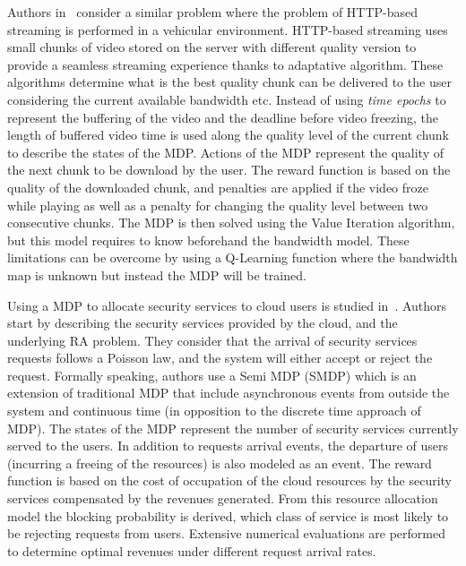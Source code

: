 Authors in~\cite{Bokani2015} consider a similar problem where the problem of HTTP-based streaming is performed in a vehicular environment.
HTTP-based streaming uses small chunks of video stored on the server with different quality version to provide a seamless streaming experience thanks to adaptative algorithm. 
These algorithms determine what is the best quality chunk can be delivered to the user considering the current available bandwidth etc. Instead of using \textit{time epochs} to represent the buffering of the video and the deadline before video freezing, the length of buffered video time is used along the quality level of the current chunk to describe the states of the MDP. 
Actions of the MDP represent the quality of the next chunk to be download by the user.
The reward function is based on the quality of the downloaded chunk, and penalties are applied if the video froze while playing as well as a penalty for changing the quality level between two consecutive chunks.
The MDP is then solved using the Value Iteration algorithm, but this model requires to know beforehand the bandwidth model. 
These limitations can be overcome by using a Q-Learning function where the bandwidth map is unknown but instead the MDP will be trained.


Using a MDP to allocate security services to cloud users is studied in~\cite{Liang2011}.
Authors start by describing the security services provided by the cloud, and the underlying RA problem.
They consider that the arrival of security services requests follows a Poisson law, and the system will either accept or reject the request. Formally speaking, authors use a Semi MDP (SMDP) which is an extension of traditional MDP that include asynchronous events from outside the system and continuous time (in opposition to the discrete time approach of MDP).
The states of the MDP represent the number of security services currently served to the users. In addition to requests arrival events, the departure of users (incurring a freeing of the resources) is also modeled as an event. The reward function is based on the cost of occupation of the cloud resources by the security services compensated by the revenues generated. 
From this resource allocation model the blocking probability is derived, \ie which class of service is most likely to be rejecting requests from users. Extensive numerical evaluations are performed to determine optimal revenues under different request arrival rates.

